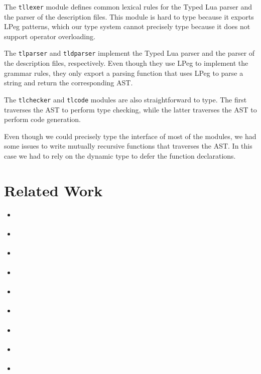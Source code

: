 The \texttt{tllexer} module defines common lexical rules for
the Typed Lua parser and the parser of the description files.
This module is hard to type because it exports LPeg \citep{lpeg,ierusalimschy2009lpeg}
patterns, which our type system cannot precisely type because it does
not support operator overloading.

The \texttt{tlparser} and \texttt{tldparser} implement the Typed Lua
parser and the parser of the description files, respectively.
Even though they use LPeg to implement the grammar rules,
they only export a parsing function that uses LPeg to parse a
string and return the corresponding AST.

The \texttt{tlchecker} and \texttt{tlcode} modules are also
straightforward to type.
The first traverses the AST to perform type checking,
while the latter traverses the AST to perform code generation.

Even though we could precisely type the interface of most of
the modules, we had some issues to write mutually recursive
functions that traverses the AST.
In this case we had to rely on the dynamic type to defer the
function declarations.

\section{Related Work}
\label{sec:relatedwork}

\begin{itemize}
\item \citep{tidallock}
\item \citep{bonnaire-sergeant2012typed-clojure}
\item \citep{vitousek2014deg}
\item \citep{allende2013gts}
\item \citep{tobin-hochstadt2008ts} 
\item \citep{dart}
\item \citep{typescript}
\item \citep{bierman2014typescript}
\item \citep{politz2012semantics}
\end{itemize}
